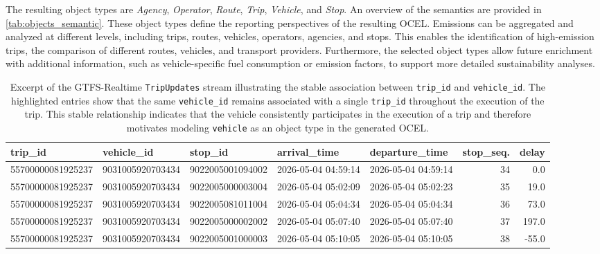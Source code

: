The resulting object types are \textit{Agency}, \textit{Operator}, \textit{Route}, \textit{Trip}, \textit{Vehicle}, and \textit{Stop}. An overview of the semantics are provided in \autoref{tab:objects_semantic}. These object types define the reporting perspectives of the resulting OCEL. Emissions can be aggregated and analyzed at different levels, including trips, routes, vehicles, operators, agencies, and stops. This enables the identification of high-emission trips, the comparison of different routes, vehicles, and transport providers. Furthermore, the selected object types allow future enrichment with additional information, such as vehicle-specific fuel consumption or emission factors, to support more detailed sustainability analyses.

\begin{table}[H]
\centering
\tiny
\setlength{\tabcolsep}{2.4pt}
\renewcommand{\arraystretch}{1.15}
\caption{Excerpt of the GTFS-Realtime \texttt{TripUpdates} stream illustrating the stable association between \texttt{trip\_id} and \texttt{vehicle\_id}. The highlighted entries show that the same \texttt{vehicle\_id} remains associated with a single \texttt{trip\_id} throughout the execution of the trip. This stable relationship indicates that the vehicle consistently participates in the execution of a trip and therefore motivates modeling \texttt{vehicle} as an object type in the generated OCEL.}
\label{tab:gtfs-realtime-trip-update-excerpt}
\begin{tabular}{lllllrr}
\toprule
\textbf{trip\_id} &
\textbf{vehicle\_id} &
\textbf{stop\_id} &
\textbf{arrival\_time} &
\textbf{departure\_time} &
\textbf{stop\_seq.} &
\textbf{delay} \\
\midrule
\cellcolor{green!20}55700000081925237 & \cellcolor{green!20}9031005920703434 & 9022005001094002 & 2026-05-04 04:59:14 & 2026-05-04 04:59:14 & 34 & 0.0 \\
\cellcolor{green!20}55700000081925237 & \cellcolor{green!20}9031005920703434 & 9022005000003004 & 2026-05-04 05:02:09 & 2026-05-04 05:02:23 & 35 & 19.0 \\
\cellcolor{green!20}55700000081925237 & \cellcolor{green!20}9031005920703434 & 9022005081011004 & 2026-05-04 05:04:34 & 2026-05-04 05:04:34 & 36 & 73.0 \\
\cellcolor{green!20}55700000081925237 & \cellcolor{green!20}9031005920703434 & 9022005000002002 & 2026-05-04 05:07:40 & 2026-05-04 05:07:40 & 37 & 197.0 \\
\cellcolor{green!20}55700000081925237 & \cellcolor{green!20}9031005920703434 & 9022005001000003 & 2026-05-04 05:10:05 & 2026-05-04 05:10:05 & 38 & -55.0 \\

\end{tabular}
\end{table}
